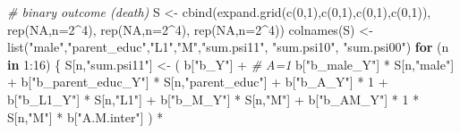 \documentclass[
]{book}
\newenvironment{Shaded}{\begin{snugshade}}{\end{snugshade}}
\newcommand{\AttributeTok}[1]{\textcolor[rgb]{0.77,0.63,0.00}{#1}}
\newcommand{\CommentTok}[1]{\textcolor[rgb]{0.56,0.35,0.01}{\textit{#1}}}
\newcommand{\ConstantTok}[1]{\textcolor[rgb]{0.00,0.00,0.00}{#1}}
\newcommand{\ControlFlowTok}[1]{\textcolor[rgb]{0.13,0.29,0.53}{\textbf{#1}}}
\newcommand{\DecValTok}[1]{\textcolor[rgb]{0.00,0.00,0.81}{#1}}
\newcommand{\FunctionTok}[1]{\textcolor[rgb]{0.00,0.00,0.00}{#1}}
\newcommand{\NormalTok}[1]{#1}
\newcommand{\OtherTok}[1]{\textcolor[rgb]{0.56,0.35,0.01}{#1}}
\newcommand{\SpecialCharTok}[1]{\textcolor[rgb]{0.00,0.00,0.00}{#1}}
\newcommand{\StringTok}[1]{\textcolor[rgb]{0.31,0.60,0.02}{#1}}
\begin{document}
\begin{Shaded}
\begin{Highlighting}[]
  \CommentTok{\# binary outcome (death)}
\NormalTok{  S }\OtherTok{\textless{}{-}} \FunctionTok{cbind}\NormalTok{(}\FunctionTok{expand.grid}\NormalTok{(}\FunctionTok{c}\NormalTok{(}\DecValTok{0}\NormalTok{,}\DecValTok{1}\NormalTok{),}\FunctionTok{c}\NormalTok{(}\DecValTok{0}\NormalTok{,}\DecValTok{1}\NormalTok{),}\FunctionTok{c}\NormalTok{(}\DecValTok{0}\NormalTok{,}\DecValTok{1}\NormalTok{),}\FunctionTok{c}\NormalTok{(}\DecValTok{0}\NormalTok{,}\DecValTok{1}\NormalTok{)), }\FunctionTok{rep}\NormalTok{(}\ConstantTok{NA}\NormalTok{,}\AttributeTok{n=}\DecValTok{2}\SpecialCharTok{\^{}}\DecValTok{4}\NormalTok{), }\FunctionTok{rep}\NormalTok{(}\ConstantTok{NA}\NormalTok{,}\AttributeTok{n=}\DecValTok{2}\SpecialCharTok{\^{}}\DecValTok{4}\NormalTok{), }
             \FunctionTok{rep}\NormalTok{(}\ConstantTok{NA}\NormalTok{,}\AttributeTok{n=}\DecValTok{2}\SpecialCharTok{\^{}}\DecValTok{4}\NormalTok{))}
  \FunctionTok{colnames}\NormalTok{(S) }\OtherTok{\textless{}{-}} \FunctionTok{list}\NormalTok{(}\StringTok{"male"}\NormalTok{,}\StringTok{"parent\_educ"}\NormalTok{,}\StringTok{"L1"}\NormalTok{,}\StringTok{"M"}\NormalTok{,}\StringTok{"sum.psi11"}\NormalTok{, }\StringTok{"sum.psi10"}\NormalTok{, }\StringTok{"sum.psi00"}\NormalTok{)}
  \ControlFlowTok{for}\NormalTok{ (n }\ControlFlowTok{in} \DecValTok{1}\SpecialCharTok{:}\DecValTok{16}\NormalTok{) \{}
\NormalTok{    S[n,}\StringTok{"sum.psi11"}\NormalTok{] }\OtherTok{\textless{}{-}}\NormalTok{  ( b[}\StringTok{"b\_Y"}\NormalTok{] }\SpecialCharTok{+}                                            \CommentTok{\# A=1}
\NormalTok{                             b[}\StringTok{"b\_male\_Y"}\NormalTok{] }\SpecialCharTok{*}\NormalTok{ S[n,}\StringTok{"male"}\NormalTok{] }\SpecialCharTok{+} 
\NormalTok{                             b[}\StringTok{"b\_parent\_educ\_Y"}\NormalTok{] }\SpecialCharTok{*}\NormalTok{ S[n,}\StringTok{"parent\_educ"}\NormalTok{] }\SpecialCharTok{+} 
\NormalTok{                             b[}\StringTok{"b\_A\_Y"}\NormalTok{] }\SpecialCharTok{*} \DecValTok{1} \SpecialCharTok{+} 
\NormalTok{                             b[}\StringTok{"b\_L1\_Y"}\NormalTok{] }\SpecialCharTok{*}\NormalTok{ S[n,}\StringTok{"L1"}\NormalTok{] }\SpecialCharTok{+}
\NormalTok{                             b[}\StringTok{"b\_M\_Y"}\NormalTok{] }\SpecialCharTok{*}\NormalTok{ S[n,}\StringTok{"M"}\NormalTok{] }\SpecialCharTok{+}
\NormalTok{                             b[}\StringTok{"b\_AM\_Y"}\NormalTok{] }\SpecialCharTok{*} \DecValTok{1} \SpecialCharTok{*}\NormalTok{ S[n,}\StringTok{"M"}\NormalTok{] }\SpecialCharTok{*}\NormalTok{ b[}\StringTok{"A.M.inter"}\NormalTok{] ) }\SpecialCharTok{*}

\end{Highlighting}
\end{Shaded}
\end{document}
